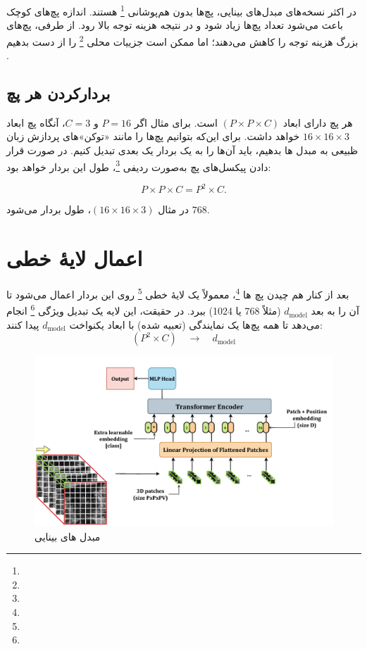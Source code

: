 در اکثر نسخه‌های مبدل‌های بینایی، پچ‌ها بدون هم‌پوشانی \footnote{} هستند. اندازه پچ‌های کوچک باعث می‌شود تعداد پچ‌ها زیاد شود و در نتیجه هزینه توجه بالا رود. از طرفی، پچ‌های بزرگ هزینه توجه را کاهش می‌دهند؛ اما ممکن است جزییات محلی \footnote{} را از دست بدهیم \cite{dosovitskiy2020image}.


\subsection{بردارکردن هر پچ}
هر پچ دارای ابعاد \((P \times P \times C)\) است. برای مثال اگر \(P=16\) و \(C=3\)، آنگاه پچ ابعاد \(16 \times 16 \times 3\) خواهد داشت.  
برای این‌که بتوانیم پچ‌ها را مانند «توکن»‌های پردازش زبان ظبیعی به مبدل ها بدهیم، باید آن‌ها را به یک بردار یک ‌بعدی تبدیل کنیم. در صورت قرار دادن پیکسل‌های پچ به‌صورت ردیفی \footnote{}، طول این بردار خواهد بود:

\begin{equation}
	P \times P \times C = P^2 \times C.
	\label{eq:patch_volume}
\end{equation}

در مثال \((16 \times 16 \times 3)\)، طول بردار می‌شود \(768\).


\section{اعمال لایهٔ خطی}
بعد از کنار هم چیدن پچ ها \footnote{}، معمولاً یک لایهٔ خطی \footnote{} روی این بردار اعمال می‌شود تا آن را به بعد \(d_{\text{model}}\) (مثلاً 768 یا 1024) ببرد. در حقیقت، این لایه یک تبدیل ویژگی \footnote{} انجام می‌دهد تا همه پچ‌ها یک نمایندگی (تعبیه شده) با ابعاد یکنواخت \(d_{\text{model}}\) پیدا کنند:
\[
(P^2 \times C) \quad \rightarrow \quad d_{\text{model}}
\]

\begin{figure}[h]
	\centering
	\begin{minipage}[b]{0.9\textwidth}
		\centering
		\includegraphics[width=\textwidth]{transformer_images/vision_transformer_embedding.png}
		\caption{مبدل های بینایی}
		\label{fig:Embedding Vision Transformer}
	\end{minipage}
	\hfill
\end{figure}

